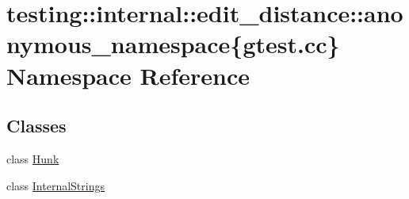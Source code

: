 \hypertarget{namespacetesting_1_1internal_1_1edit__distance_1_1anonymous__namespace_02gtest_8cc_03}{}\section{testing\+:\+:internal\+:\+:edit\+\_\+distance\+:\+:anonymous\+\_\+namespace\{gtest.\+cc\} Namespace Reference}
\label{namespacetesting_1_1internal_1_1edit__distance_1_1anonymous__namespace_02gtest_8cc_03}
\subsection*{Classes}
\begin{DoxyCompactItemize}
\item 
class \hyperlink{classtesting_1_1internal_1_1edit__distance_1_1anonymous__namespace_02gtest_8cc_03_1_1Hunk}{Hunk}
\item 
class \hyperlink{classtesting_1_1internal_1_1edit__distance_1_1anonymous__namespace_02gtest_8cc_03_1_1InternalStrings}{Internal\+Strings}
\end{DoxyCompactItemize}
